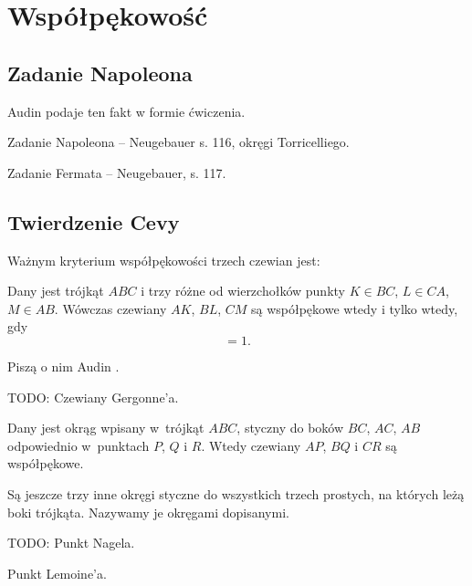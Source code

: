 \section{Współpękowość}
\subsection{Zadanie Napoleona}
Audin \cite[s. 105]{audin_2003} podaje ten fakt w formie ćwiczenia. %


Zadanie Napoleona -- Neugebauer s. 116, okręgi Torricelliego.

Zadanie Fermata -- Neugebauer, s. 117.

\subsection{Twierdzenie Cevy}
Ważnym kryterium współpękowości trzech czewian jest:

\begin{proposition}
	Dany jest trójkąt $ABC$ i trzy różne od wierzchołków punkty $K \in BC$, $L \in CA$, $M \in AB$.
	Wówczas czewiany $AK$, $BL$, $CM$ są współpękowe wtedy i tylko wtedy, gdy
	\begin{equation}
		[AMB] [BKC] [CLA] = 1.
	\end{equation}
\end{proposition}

Piszą o nim Audin \cite[s. 38]{audin_2003}.

TODO: Czewiany Gergonne'a.

\begin{definition} %
%
	Dany jest okrąg wpisany w~trójkąt $ABC$, styczny do boków $BC$, $AC$, $AB$ odpowiednio w~punktach $P$, $Q$ i $R$.
	Wtedy czewiany $AP$, $BQ$ i $CR$ są współpękowe.
\end{definition}

Są jeszcze trzy inne okręgi styczne do wszystkich trzech prostych, na których leżą boki trójkąta.
Nazywamy je okręgami dopisanymi.

TODO: Punkt Nagela.



Punkt Lemoine'a.


